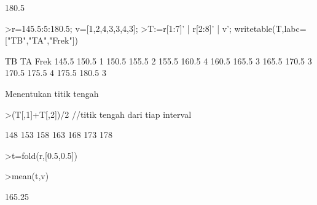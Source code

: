 \documentclass[12pt,arial,letterpaper]{book}
\begin{document}
\begin{eulercomment}
\begin{eulercomment}
\begin{eulercomment}
\begin{eulercomment}
\begin{eulercomment}
\begin{eulercomment}
\begin{eulercomment}
\begin{eulercomment}
\begin{eulercomment}
\begin{eulercomment}
\begin{eulercomment}
\begin{eulercomment}
\begin{eulercomment}
\begin{eulercomment}
\begin{eulercomment}
\begin{eulercomment}
\begin{eulercomment}
\begin{eulercomment}
\begin{eulercomment}
\begin{eulercomment}
\begin{eulercomment}
\begin{eulercomment}
\begin{eulercomment}
\begin{eulercomment}
\begin{eulercomment}
\begin{eulercomment}
\begin{eulercomment}
\begin{eulercomment}
\begin{eulercomment}
\begin{eulercomment}
\begin{eulercomment}
\begin{eulercomment}
\begin{eulercomment}
\begin{eulercomment}
\begin{eulercomment}
\begin{eulercomment}
\begin{eulercomment}
\begin{eulercomment}
\begin{euleroutput}
  180.5
\end{euleroutput}
\begin{eulerprompt}
>r=145.5:5:180.5; v=[1,2,4,3,3,4,3];
>T:=r[1:7]' | r[2:8]' | v'; writetable(T,labc=["TB","TA","Frek"])
\end{eulerprompt}
\begin{euleroutput}
          TB        TA      Frek
       145.5     150.5         1
       150.5     155.5         2
       155.5     160.5         4
       160.5     165.5         3
       165.5     170.5         3
       170.5     175.5         4
       175.5     180.5         3
\end{euleroutput}
\begin{eulercomment}
Menentukan titik tengah
\end{eulercomment}
\begin{eulerprompt}
>(T[,1]+T[,2])/2 //titik tengah dari tiap interval
\end{eulerprompt}
\begin{euleroutput}
        148 
        153 
        158 
        163 
        168 
        173 
        178 
\end{euleroutput}
\begin{eulerprompt}
>t=fold(r,[0.5,0.5])
\end{eulerprompt}
\begin{euleroutput}
  [148,  153,  158,  163,  168,  173,  178]
\end{euleroutput}
\begin{eulerprompt}
>mean(t,v)
\end{eulerprompt}
\begin{euleroutput}
  165.25
\end{euleroutput}

\end{eulercomment}
\end{eulercomment}
\end{eulercomment}
\end{eulercomment}
\end{eulercomment}
\end{eulercomment}
\end{eulercomment}
\end{eulercomment}
\end{eulercomment}
\end{eulercomment}
\end{eulercomment}
\end{eulercomment}
\end{eulercomment}
\end{eulercomment}
\end{eulercomment}
\end{eulercomment}
\end{eulercomment}
\end{eulercomment}
\end{eulercomment}
\end{eulercomment}
\end{eulercomment}
\end{eulercomment}
\end{eulercomment}
\end{eulercomment}
\end{eulercomment}
\end{eulercomment}
\end{eulercomment}
\end{eulercomment}
\end{eulercomment}
\end{eulercomment}
\end{eulercomment}
\end{eulercomment}
\end{eulercomment}
\end{eulercomment}
\end{eulercomment}
\end{eulercomment}
\end{eulercomment}
\end{eulercomment}
\end{document}
